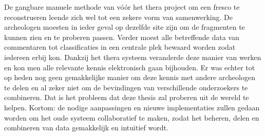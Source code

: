 De gangbare manuele methode van v\'o\'or het thera project om een fresco te reconstrueren leende zich wel tot een zekere vorm van samenwerking. 
De archeologen moesten in ieder geval op dezelfde site zijn om de fragmenten te kunnen zien en te proberen passen. Verder moest alle betreffende data van commentaren tot
classificaties in een centrale plek bewaard worden zodat iedereen erbij kon. Dankzij het thera systeem veranderde deze manier van werken en kon men alle relevante kennis elektronisch gaan bijhouden.
Er was echter tot op heden nog geen gemakkelijke manier om deze kennis met andere archeologen te delen en al zeker niet om de bevindingen van verschillende onderzoekers
te combineren. Dat is het probleem dat deze thesis zal proberen uit de wereld te helpen. Kortom: de nodige aanpassingen en nieuwe implementaties zullen gedaan worden
om het oude systeem collaboratief te maken, zodat het beheren, delen en combineren van data gemakkelijk en intuitief wordt.\\

